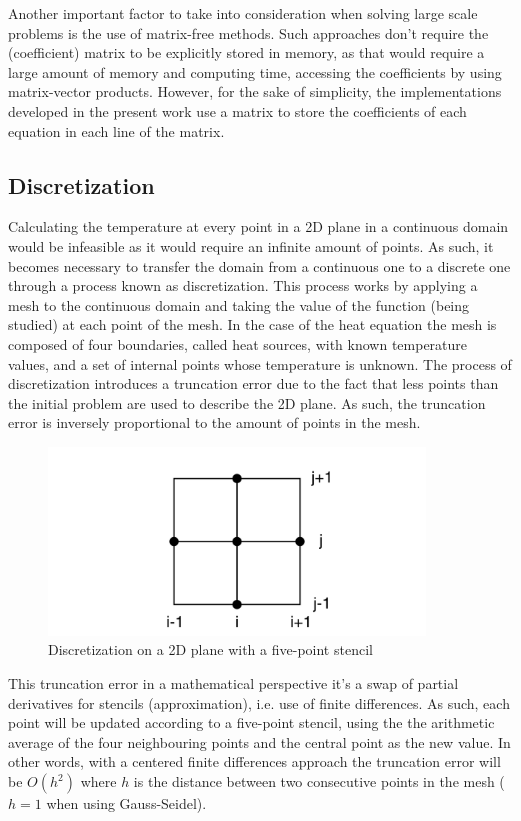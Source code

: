 \documentclass{article}
\begin{document}
Another important factor to take into consideration when solving large scale problems is the use of matrix-free methods. Such approaches don't require
the (coefficient) matrix to be explicitly stored in memory, as that would require a large amount of memory and computing time, accessing the coefficients
by using matrix-vector products. 
However, for the sake of simplicity, the implementations developed in the present work use a matrix to store the coefficients of each equation in each 
line of the matrix.

\subsection{Discretization}
Calculating the temperature at every point in a 2D plane in a continuous domain would be infeasible as it would require an infinite amount of points.
As such, it becomes necessary to transfer the domain from a continuous one to a discrete one through a process known as discretization.
This process works by applying a mesh to the continuous domain and taking the value of the function (being studied) at each point of the mesh. In the case of the heat
equation the mesh is composed of four boundaries, called heat sources, with known temperature values, and a set of internal points whose temperature
is unknown. The process of discretization introduces a truncation error due to the fact that less points than the initial problem are used to describe the 2D
plane. As such, the truncation error is inversely proportional to the amount of points in the mesh. 

\begin{figure}[H]
    \centering
    \includegraphics[width=10cm]{Pictures/Discretization.png}
    \caption{Discretization on a 2D plane with a five-point stencil}
    \label{fig:discretization}
\end{figure}

This truncation error in a mathematical perspective it's a swap of partial derivatives for stencils (approximation), i.e. use of finite differences. As such, 
each point will be updated according to a five-point stencil, using the the arithmetic average of the four neighbouring points and the central point as the 
new value. In other words, with a centered finite differences approach the truncation error will be $O(h^2)$ where $h$ is the distance between two 
consecutive points in the mesh ($h=1$ when using Gauss-Seidel).
\end{document}
